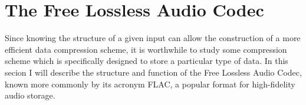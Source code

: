 \documentclass[12pt]{article}
\begin{document}
\section{The Free Lossless Audio Codec}

Since knowing the structure of a given input can allow the
construction of a more efficient data compression scheme, it is
worthwhile to study some compression scheme which is specifically
designed to store a particular type of data. In this secion I will
describe the structure and function of the Free Lossless Audio Codec,
known more commonly by its acronym FLAC, a popular format for
high-fidelity audio storage.



\end{document}
